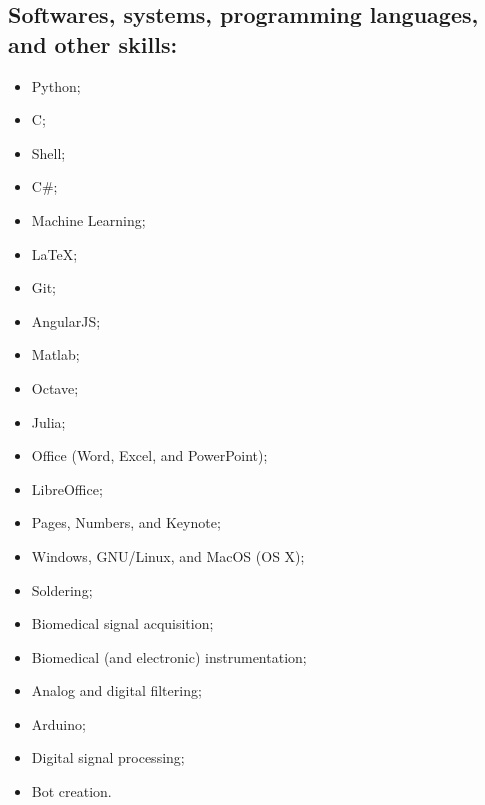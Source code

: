 \documentclass[11pt]{article}
\begin{document}
\subsection{Softwares, systems, programming languages, and other skills:}
\begin{multicols}{3} %
\begin{itemize}
    \item Python;
    \item C;
    \item Shell;
    \item C\#;
    \item Machine Learning;
    \item \LaTeX ;
    \item Git;
    \item AngularJS;
    \item Matlab;
    \item Octave;
    \item Julia;
    \item Office (Word, Excel, and PowerPoint);
    \item LibreOffice;
    \item Pages, Numbers, and Keynote;
    \item Windows, GNU/Linux, and MacOS (OS X);
    \item Soldering;
    \item Biomedical signal acquisition;
    \item Biomedical (and electronic) instrumentation;
    \item Analog and digital filtering;
    \item Arduino;
    \item Digital signal processing;
    \item Bot creation.
\end{itemize}
\end{multicols}
\end{document}
